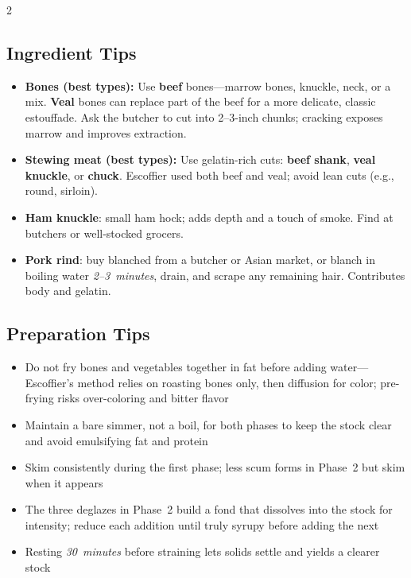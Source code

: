 \documentclass[11pt,letterpaper]{article}
\begin{document}
{\begin{multicols}{2}
\subsection*{Ingredient Tips}
\begin{itemize}
    \item \textbf{Bones (best types):} Use \textbf{beef} bones---marrow bones, knuckle, neck, or a mix. \textbf{Veal} bones can replace part of the beef for a more delicate, classic estouffade. Ask the butcher to cut into 2--3-inch chunks; cracking exposes marrow and improves extraction.
    \item \textbf{Stewing meat (best types):} Use gelatin-rich cuts: \textbf{beef shank}, \textbf{veal knuckle}, or \textbf{chuck}. Escoffier used both beef and veal; avoid lean cuts (e.g., round, sirloin).
    \item \textbf{Ham knuckle}: small ham hock; adds depth and a touch of smoke. Find at butchers or well-stocked grocers.
    \item \textbf{Pork rind}: buy blanched from a butcher or Asian market, or blanch in boiling water \textit{2--3~minutes}, drain, and scrape any remaining hair. Contributes body and gelatin.
\end{itemize}

\subsection*{Preparation Tips}
\begin{itemize}
    \item Do not fry bones and vegetables together in fat before adding water---Escoffier's method relies on roasting bones only, then diffusion for color; pre-frying risks over-coloring and bitter flavor
    \item Maintain a bare simmer, not a boil, for both phases to keep the stock clear and avoid emulsifying fat and protein
    \item Skim consistently during the first phase; less scum forms in Phase~2 but skim when it appears
    \item The three deglazes in Phase~2 build a fond that dissolves into the stock for intensity; reduce each addition until truly syrupy before adding the next
    \item Resting \textit{30~minutes} before straining lets solids settle and yields a clearer stock
\end{itemize}


\end{multicols}}
\end{document}
